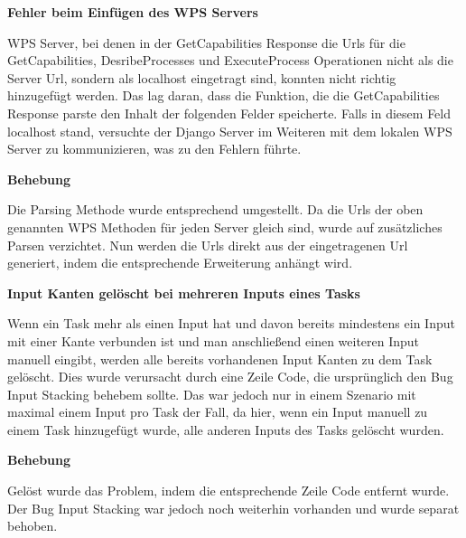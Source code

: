 \textbf{\large Fehler beim Einfügen des WPS Servers}
\newline


WPS Server, bei denen in der GetCapabilities Response die Urls für die GetCapabilities, DesribeProcesses und ExecuteProcess Operationen nicht als die Server Url, sondern als localhost eingetragt sind, konnten nicht richtig hinzugefügt werden. Das lag daran, dass die Funktion, die die GetCapabilities Response parste den Inhalt der folgenden Felder speicherte. Falls in diesem Feld \glqq localhost\grqq{} stand, versuchte der Django Server im Weiteren mit dem lokalen WPS Server zu kommunizieren, was zu den Fehlern führte.
\newline


\textbf{Behebung}
\newline


Die Parsing Methode wurde entsprechend umgestellt. Da die Urls der oben genannten WPS Methoden für jeden Server gleich sind, wurde auf zusätzliches Parsen verzichtet. Nun werden die Urls direkt aus der eingetragenen Url generiert, indem die entsprechende Erweiterung anhängt wird. 
\newline

\vspace{2em}



\textbf{\large Input Kanten gelöscht bei mehreren Inputs eines Tasks}
\newline


Wenn ein Task mehr als einen Input hat und davon bereits mindestens ein Input mit einer Kante verbunden ist und man anschließend einen weiteren Input manuell eingibt, werden alle bereits vorhandenen Input Kanten zu dem Task gelöscht. Dies wurde verursacht durch eine Zeile Code, die ursprünglich den Bug \glqq Input Stacking\grqq{} behebem sollte. Das war jedoch nur in einem Szenario mit maximal einem Input pro Task der Fall, da hier, wenn ein Input manuell zu einem Task hinzugefügt wurde, alle anderen Inputs des Tasks gelöscht wurden. 
\newline


\textbf{Behebung}
\newline


Gelöst wurde das Problem, indem die entsprechende Zeile Code entfernt wurde. Der Bug \glqq Input Stacking\grqq{} war jedoch noch weiterhin vorhanden und wurde separat behoben. 
\newline

